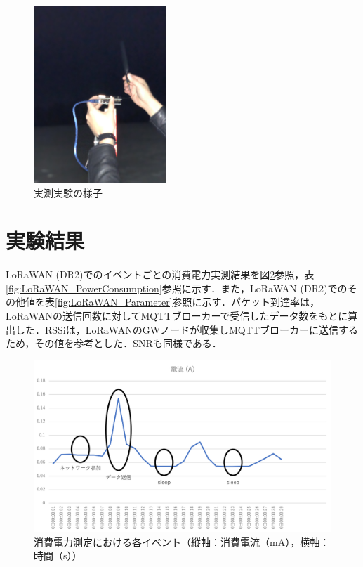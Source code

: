 \begin{figure}[]
    \begin{center}
    \includegraphics[width=5cm]{figures/experiment.jpg}
    \caption{実測実験の様子}
    \label{fig:experiment}
    \end{center}
\end{figure}

\section{実験結果}
LoRaWAN (DR2)でのイベントごとの消費電力実測結果を図\ref{fig:result_power_consumtion}参照，表\ref{fig:LoRaWAN_PowerConsumption}参照に示す．また，LoRaWAN (DR2)でのその他値を表\ref{fig:LoRaWAN_Parameter}参照に示す．パケット到達率は，LoRaWANの送信回数に対してMQTTブローカーで受信したデータ数をもとに算出した．RSSiは，LoRaWANのGWノードが収集しMQTTブローカーに送信するため，その値を参考とした．SNRも同様である．

\begin{figure}[]
    \begin{center}
    \includegraphics[width=15cm]{figures/LoRaWAN_消費電力実験.png}
    \caption{消費電力測定における各イベント（縦軸：消費電流（mA），横軸：時間（s））}
    \label{fig:result_power_consumtion}
    \end{center}
\end{figure}

